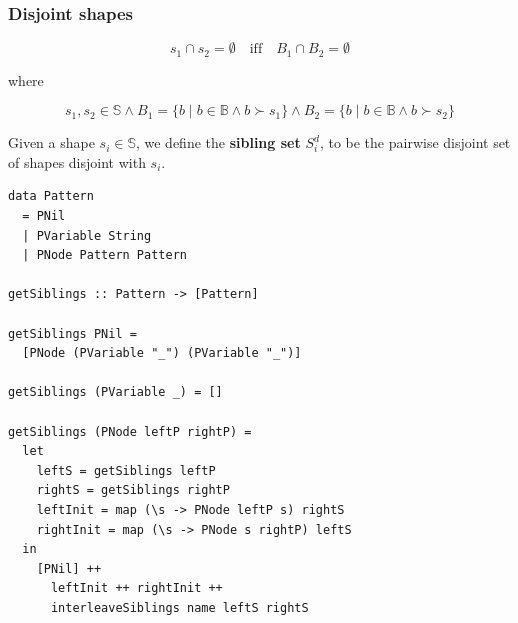 \begin{frame}
\begin{columns}
\end{columns}

\end{frame}

\begin{frame}

\frametitle{Disjoint shapes}

\begin{center}

$$s_1\cap s_2=\emptyset\quad\text{iff}\quad B_1\cap B_2=\emptyset$$

where

$$s_1,s_2\in\mathbb{S} \wedge B_1=\{b\mid b\in\mathbb{B} \wedge b\succ
s_1\}\wedge B_2=\{b\mid b\in\mathbb{B} \wedge b\succ s_2\}$$

\end{center}

\end{frame}


\begin{frame}

\begin{center}

Given a shape $s_i\in\mathbb{S}$, we define the {\bf sibling set} $S^d_i$, to
be the pairwise disjoint set of shapes disjoint with $s_i$.

\end{center}

\end{frame}

\begin{frame}[fragile]

\begin{lstlisting}
data Pattern
  = PNil
  | PVariable String
  | PNode Pattern Pattern

getSiblings :: Pattern -> [Pattern]

getSiblings PNil =
  [PNode (PVariable "_") (PVariable "_")]

getSiblings (PVariable _) = []

getSiblings (PNode leftP rightP) =
  let
    leftS = getSiblings leftP
    rightS = getSiblings rightP
    leftInit = map (\s -> PNode leftP s) rightS
    rightInit = map (\s -> PNode s rightP) leftS
  in
    [PNil] ++
      leftInit ++ rightInit ++
      interleaveSiblings name leftS rightS
\end{lstlisting}

\end{frame}
